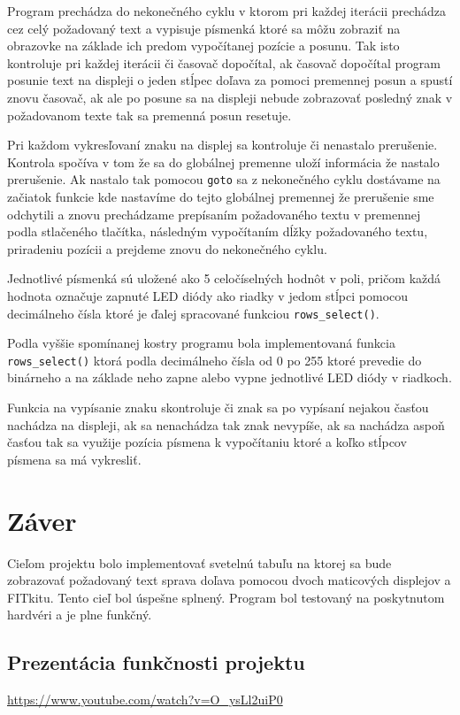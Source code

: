 \documentclass[a4paper, 11pt]{article}
\begin{document}
        Program prechádza do nekonečného cyklu v ktorom pri každej iterácii prechádza cez celý požadovaný text a vypisuje písmenká ktoré sa môžu zobraziť na obrazovke na základe ich predom vypočítanej pozície a posunu. Tak isto kontroluje pri každej iterácii či časovač dopočítal, ak časovač dopočítal program posunie text na displeji o jeden stĺpec doľava za pomoci premennej posun a spustí znovu časovač, ak ale po posune sa na displeji nebude zobrazovať posledný znak v požadovanom texte tak sa premenná posun resetuje.

        Pri každom vykresľovaní znaku na displej sa kontroluje či nenastalo prerušenie. Kontrola spočíva v tom že sa do globálnej premenne uloží informácia že nastalo prerušenie. Ak nastalo tak pomocou \texttt{goto} sa z nekonečného cyklu dostávame na začiatok funkcie kde nastavíme do tejto globálnej premennej že prerušenie sme odchytili a znovu prechádzame prepísaním požadovaného textu v premennej podla stlačeného tlačítka, následným vypočítaním dĺžky požadovaného textu, priradeniu pozícii a prejdeme znovu do nekonečného cyklu. 

        Jednotlivé písmenká sú uložené ako 5 celočíselných hodnôt v poli, pričom každá hodnota označuje zapnuté LED diódy ako riadky v jedom stĺpci pomocou decimálneho čísla ktoré je ďalej spracované funkciou \texttt{rows\_select()}.

        Podla vyššie spomínanej kostry programu bola implementovaná funkcia \texttt{rows\_select()} ktorá podla decimálneho čísla od 0 po 255 ktoré prevedie do binárneho a na základe neho zapne alebo vypne jednotlivé LED diódy v riadkoch.

        Funkcia na vypísanie znaku skontroluje či znak sa po vypísaní nejakou časťou nachádza na displeji, ak sa nenachádza tak znak nevypíše, ak sa nachádza aspoň časťou tak sa využije pozícia písmena k vypočítaniu ktoré a koľko stĺpcov písmena sa má vykresliť.  
\newpage
\section{Záver}
        Cieľom projektu bolo implementovať svetelnú tabuľu na ktorej sa bude zobrazovať požadovaný text sprava doľava pomocou dvoch maticových displejov a FITkitu. Tento cieľ bol úspešne splnený. Program bol testovaný na poskytnutom hardvéri a je plne funkčný.

        \subsection{Prezentácia funkčnosti projektu}
        \href{https://www.youtube.com/watch?v=O_ysLl2uiP0}{https://www.youtube.com/watch?v=O\_ysLl2uiP0}
        
\end{document}
